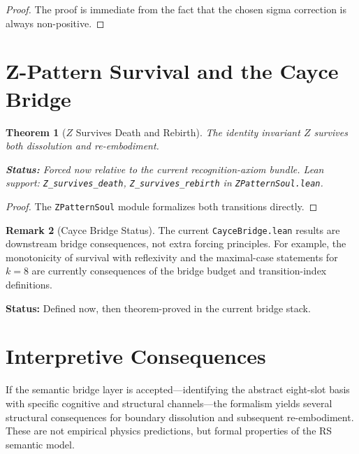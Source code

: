 \documentclass[11pt,a4paper]{article}
\newtheorem{theorem}{Theorem}[section]
\theoremstyle{definition}
\newtheorem{remark}[theorem]{Remark}
\newcommand{\Zp}{Z}
\newcommand{\code}[1]{\texttt{\small #1}}
\newcommand{\statusline}[1]{\par\smallskip\noindent\textbf{Status:} #1\par\smallskip}
\begin{document}
\begin{proof}
The proof is immediate from the fact that the chosen sigma correction is
always non-positive.
\end{proof}

\section{Z-Pattern Survival and the Cayce Bridge}
\label{sec:z}

\begin{theorem}[$\Zp$ Survives Death and Rebirth]
\label{thm:z}
The identity invariant $\Zp$ survives both dissolution and re-embodiment.
\statusline{Forced now relative to the current recognition-axiom bundle.
Lean support: \code{Z\_survives\_death}, \code{Z\_survives\_rebirth} in
\code{ZPatternSoul.lean}.}
\end{theorem}

\begin{proof}
The \code{ZPatternSoul} module formalizes both transitions directly.
\end{proof}

\begin{remark}[Cayce Bridge Status]
\label{rem:cayce}
The current \code{CayceBridge.lean} results are downstream bridge
consequences, not extra forcing principles.  For example, the monotonicity of
survival with reflexivity and the maximal-case statements for $k=8$ are
currently consequences of the bridge budget and transition-index definitions.
\statusline{Defined now, then theorem-proved in the current bridge stack.}
\end{remark}

\section{Interpretive Consequences}
\label{sec:consequences}

If the semantic bridge layer is accepted---identifying the abstract eight-slot basis with specific cognitive and structural channels---the formalism yields several structural consequences for boundary dissolution and subsequent re-embodiment. These are not empirical physics predictions, but formal properties of the RS semantic model.
\end{document}
